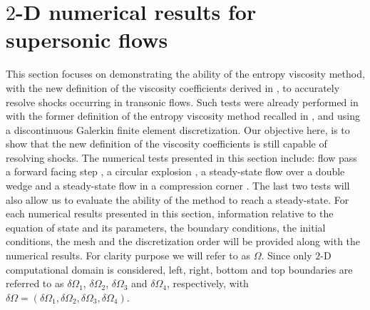\section{$2$-D numerical results for supersonic flows} \label{sec:2d-supersonic-results}
This section focuses on demonstrating the ability of the entropy viscosity method, with the new definition of the viscosity coefficients derived in , to accurately resolve shocks occurring in transonic flows. Such tests were already performed in \cite{valentin} with the former definition of the entropy viscosity method recalled in , and using a discontinuous Galerkin finite element discretization. Our objective here, is to show that the new definition of the viscosity coefficients is still capable of resolving shocks. The numerical tests presented in this section include: flow pass a forward facing step \cite{FFS}, a circular explosion \cite{Toro}, a steady-state flow over a double wedge \cite{RichThesis} and a steady-state flow in a compression corner \cite{CompressionCorner}. The last two tests will also allow us to evaluate the ability of the method to reach a steady-state. For each numerical results presented in this section, information relative to the equation of state and its parameters, the boundary conditions, the initial conditions, the mesh and the discretization order will be provided along with the numerical results. For clarity purpose we will refer to as $\Omega$. Since only $2$-D computational domain is considered, left, right, bottom and top boundaries are referred to as $\delta \Omega_1$, $\delta \Omega_2$, $\delta \Omega_3$ and $\delta \Omega_4$, respectively, with $\delta \Omega = ( \delta \Omega_1,  \delta \Omega_2, \delta \Omega_3, \delta \Omega_4)$. 
